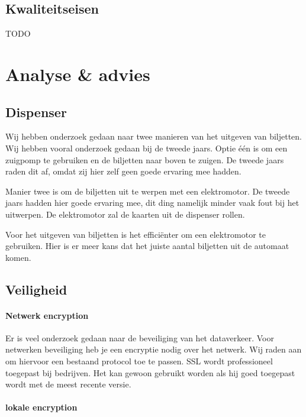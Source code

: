\documentclass{article}
\begin{document}
\subsection{Kwaliteitseisen}

TODO

\section{Analyse \& advies}

\subsection{Dispenser}

Wij hebben onderzoek gedaan naar twee manieren van het uitgeven van biljetten.
Wij hebben vooral onderzoek gedaan bij de tweede jaars.
Optie \'e\'en is om een zuigpomp te gebruiken en de biljetten naar boven te zuigen.
De tweede jaars raden dit af, omdat zij hier zelf geen goede ervaring mee hadden.

Manier twee is om de biljetten uit te werpen met een elektromotor.
De tweede jaars hadden hier goede ervaring mee, dit ding namelijk minder vaak fout bij het uitwerpen.
De elektromotor zal de kaarten uit de dispenser rollen.

Voor het uitgeven van biljetten is het effici\"enter om een elektromotor te gebruiken.
Hier is er meer kans dat het juiste aantal biljetten uit de automaat komen.

\newpage

\subsection{Veiligheid}

\paragraph{Netwerk encryption}

Er is veel onderzoek gedaan naar de beveiliging van het dataverkeer.
Voor netwerken beveiliging heb je een encryptie nodig over het netwerk.
Wij raden aan om hiervoor een bestaand protocol toe te passen.
SSL wordt professioneel toegepast bij bedrijven.
Het kan gewoon gebruikt worden als hij goed toegepast wordt met de meest recente versie.

\paragraph{lokale encryption}
\end{document}
